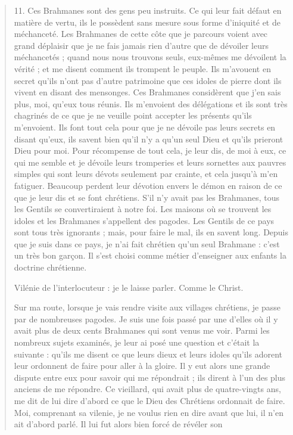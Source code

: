 \begin{quote}
11. Ces Brahmanes sont des gens peu instruits. Ce qui leur fait
défaut en matière de vertu, ils le possèdent sans mesure sous forme
d'iniquité et de méchanceté. Les Brahmanes de cette côte que je
parcours voient avec grand déplaisir que je ne fais jamais rien
d'autre que de dévoiler leurs méchancetés ; quand nous nous trouvons
seuls, eux-mêmes me dévoilent la vérité ; et me disent comment
ils trompent le peuple. Ils m'avouent en secret qu'ils n'ont
pas d'autre patrimoine que ces idoles de pierre dont ils vivent en
disant des mensonges.
Ces Brahmanes considèrent que j'en sais plus, moi, qu'eux tous
réunis. Ils m'envoient des délégations et ils sont très chagrinés de
ce que je ne veuille point accepter les présents qu'ils m'envoient.
Ils font tout cela pour que je ne dévoile pas leurs secrets en disant
qu'eux, ils savent bien qu'il n'y a qu'un seul Dieu et qu'ils prieront
Dieu pour moi. Pour récompense de tout cela, je leur dis, de
moi à eux, ce qui me semble et je dévoile leurs tromperies et leurs
sornettes aux pauvres simples qui sont leurs dévots seulement par
crainte, et cela jusqu'à m'en fatiguer. Beaucoup perdent leur dévotion
envers le démon en raison de ce que je leur dis et se font chrétiens.
S'il n'y avait pas les Brahmanes, tous les Gentils se convertiraient
à notre foi. Les maisons où se trouvent les idoles et les
Brahmanes s'appellent des pagodes.
Les Gentils de ce pays sont tous très ignorants ; mais, pour faire
le mal, ils en savent long. Depuis que je suis dans ce pays, je n'ai
fait chrétien qu'un seul Brahmane : c'est un très bon garçon. Il
s'est choisi comme métier d'enseigner aux enfants la doctrine
chrétienne.
\begin{Synthesis}
Vilénie de l'interlocuteur : je le laisse parler. Comme le Christ.
\end{Synthesis}
Sur ma route, lorsque je vais rendre visite aux villages chrétiens,
je passe par de nombreuses pagodes. Je suis une fois passé par une
d'elles où il y avait plus de deux cents Brahmanes qui sont venus
me voir. Parmi les nombreux sujets examinés, je leur ai posé une
question et c'était la suivante : qu'ils me disent ce que leurs dieux
et leurs idoles qu'ils adorent leur ordonnent de faire pour aller à
la gloire. Il y eut alors une grande dispute entre eux pour savoir
qui me répondrait ; ils dirent à l'un des plus anciens de me répondre.
  Ce vieillard, qui avait plus de quatre-vingts ans, me dit de lui
dire d'abord ce que le Dieu des Chrétiens ordonnait de faire. Moi,
comprenant sa vilenie, je ne voulus rien en dire avant que lui, il
n'en ait d'abord parlé. Il lui fut alors bien forcé de révéler son

\end{quote}
